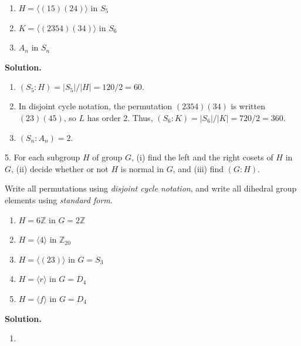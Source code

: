\documentclass[10pt,]{book}
\theoremstyle{plain}
\theoremstyle{definition}
\theoremstyle{definition}
\theoremstyle{definition}
\theoremstyle{definition}
\numberwithin{equation}{section}
\def\Z{\mathbb{Z}}
\begin{document}
\begin{exerciselist}
\begin{enumerate}[label=(\alph*)]
\item\hypertarget{li-420}{}\(H=\langle (15)(24)\rangle\) in \(S_5\)%
\item\hypertarget{li-421}{}\(K=\langle (2354)(34)\rangle\) in \(S_6\)%
\item\hypertarget{li-422}{}\(A_n\) in \(S_n\)%
\end{enumerate}
%
\par\smallskip
\par\smallskip
\noindent\textbf{Solution.}\hypertarget{solution-53}{}\quad
\leavevmode%
\begin{enumerate}[label=(\alph*)]
\item\hypertarget{li-423}{}\((S_5:H)=|S_5|/|H|=120/2=60.\)%
\item\hypertarget{li-424}{}In disjoint cycle notation, the permutation \((2354)(34)\) is written \((23)(45)\), so \(L\) has order 2. Thus, \((S_6:K)=|S_6|/|K|=720/2=360.\)%
\item\hypertarget{li-425}{}\((S_n:A_n)=2\).%
\end{enumerate}
%
\item[5.]\hypertarget{exercise-54}{}For each subgroup \(H\) of group \(G\), (i) find the left and the right cosets of \(H\) in \(G\), (ii) decide whether or not \(H\) is normal in \(G\), and (iii) find \((G:H)\).%
\par
Write all permutations using \emph{disjoint cycle notation}, and write all dihedral group elements using \emph{standard form}. \leavevmode%
\begin{enumerate}[label=(\alph*)]
\item\hypertarget{li-426}{}\(H=6\Z\) in \(G=2\Z\)%
\item\hypertarget{li-427}{}\(H=\langle 4\rangle\) in \(\Z_{20}\)%
\item\hypertarget{li-428}{}\(H=\langle (23)\rangle\) in \(G=S_3\)%
\item\hypertarget{li-429}{}\(H=\langle r\rangle\) in \(G=D_4\)%
\item\hypertarget{li-430}{}\(H=\langle f\rangle\) in \(G=D_4\)%
\end{enumerate}
%
\par\smallskip
\par\smallskip
\noindent\textbf{Solution.}\hypertarget{solution-54}{}\quad
\leavevmode%
\begin{enumerate}[label=(\alph*)]
\item\hypertarget{li-431}{}%
\begin{enumerate}[label=\roman*.]

\end{enumerate}
\end{enumerate}
\end{exerciselist}
\end{document}
